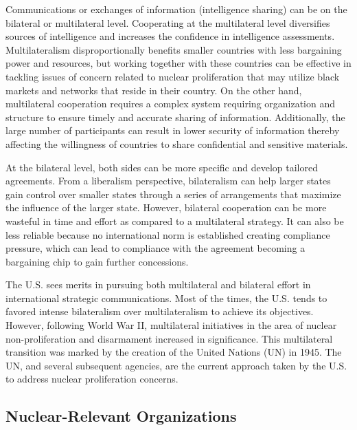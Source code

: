 \documentclass{report}
\begin{document}
Communications or exchanges of information (intelligence sharing) can be on the bilateral or multilateral level. Cooperating at the multilateral level diversifies sources of intelligence and increases the confidence in intelligence assessments. Multilateralism disproportionally benefits smaller countries with less bargaining power and resources, but working together with these countries can be effective in tackling issues of concern related to nuclear proliferation that may utilize black markets and networks that reside in their country. On the other hand, multilateral cooperation requires a complex system requiring organization and structure to ensure timely and accurate sharing of information. Additionally, the large number of participants can result in lower security of information thereby affecting the willingness of countries to share confidential and sensitive materials.

At the bilateral level, both sides can be more specific and develop tailored agreements. From a liberalism perspective, bilateralism can help larger states gain control over smaller states through a series of arrangements that maximize the influence of the larger state. However, bilateral cooperation can be more wasteful in time and effort as compared to a multilateral strategy. It can also be less reliable because no international norm is established creating compliance pressure, which can lead to compliance with the agreement becoming a bargaining chip to gain further concessions.

The U.S. sees merits in pursuing both multilateral and bilateral effort in international strategic communications. Most of the times, the U.S. tends to favored intense bilateralism over multilateralism to achieve its objectives. However, following World War II, multilateral initiatives in the area of nuclear non-proliferation and disarmament increased in significance.  This multilateral transition was marked by the creation of the United Nations (UN) in 1945.  The UN, and several subsequent agencies, are the current approach taken by the U.S. to address nuclear proliferation concerns.  

\subsection{Nuclear-Relevant Organizations }
\end{document}
